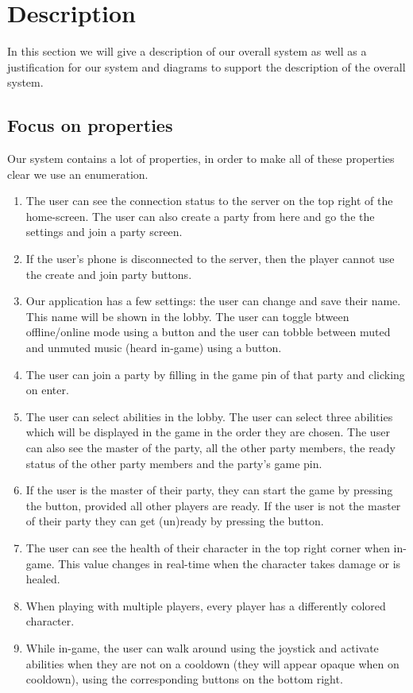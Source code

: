 \documentclass[../main.tex]{subfiles}
\begin{document}
\pagebreak
\section{Description}
In this section we will give a description of our overall system as well as a justification for our system and diagrams to support the description of the overall system.

    \subsection{Focus on properties}
	Our system contains a lot of properties, in order to make all of these properties clear we use an enumeration.
	\begin{enumerate}
		\item The user can see the connection status to the server on the top right of the home-screen. The user can also create a party from here and go the the settings and join a party screen.
		\item If the user's phone is disconnected to the server, then the player cannot use the create and join party buttons.
		\item Our application has a few settings: the user can change and save their name. This name will be shown in the lobby. The user can toggle btween offline/online mode using a button and the user can tobble between muted and unmuted music (heard in-game) using a button.
		\item The user can join a party by filling in the game pin of that party and clicking on enter.
		\item The user can select abilities in the lobby. The user can select three abilities which will be displayed in the game in the order they are chosen. The user can also see the master of the party, all the other party members, the ready status of the other party members and the party's game pin.
		\item If the user is the master of their party, they can start the game by pressing the button, provided all other players are ready. If the user is not the master of their party they can get (un)ready by pressing the button.
		\item The user can see the health of their character in the top right corner when in-game. This value changes in real-time when the character takes damage or is healed.
		\item When playing with multiple players, every player has a differently colored character.		
		\item While in-game, the user can walk around using the joystick and activate abilities when they are not on a cooldown (they will appear opaque when on cooldown), using the corresponding buttons on the bottom right. 

\end{enumerate}
\end{document}
